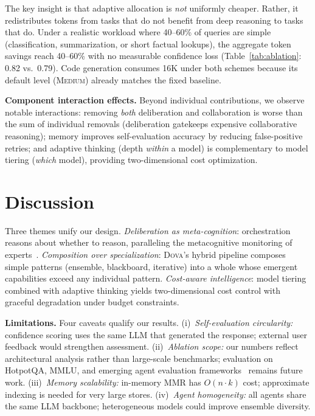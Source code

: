 \documentclass{article}
\theoremstyle{plain}
\theoremstyle{definition}
\newcommand{\dova}{\textsc{Dova}}
\begin{document}
The key insight is that adaptive allocation is \emph{not} uniformly cheaper.
Rather, it redistributes tokens from tasks that do not benefit from deep
reasoning to tasks that do.  Under a realistic workload where 40--60\% of
queries are simple (classification, summarization, or short factual lookups),
the aggregate token savings reach 40--60\% with no measurable confidence loss
(Table~\ref{tab:ablation}: 0.82 vs.\ 0.79).  Code generation consumes 16K
under both schemes because its default level (\textsc{Medium}) already matches
the fixed baseline.

\textbf{Component interaction effects.}\quad
Beyond individual contributions, we observe notable interactions: removing
\emph{both} deliberation and collaboration is worse than the sum of
individual removals (deliberation gatekeeps expensive collaborative
reasoning); memory improves self-evaluation accuracy by reducing
false-positive retries; and adaptive thinking (depth \emph{within} a model)
is complementary to model tiering (\emph{which} model), providing
two-dimensional cost optimization.

\section{Discussion}\label{sec:discussion}

Three themes unify our design.  \emph{Deliberation as meta-cognition}:
orchestration reasons about whether to reason, paralleling the metacognitive
monitoring of experts~\citep{shinn2023reflexion}.  \emph{Composition over
specialization}: \dova{}'s hybrid pipeline composes simple patterns (ensemble,
blackboard, iterative) into a whole whose emergent capabilities exceed any
individual pattern.  \emph{Cost-aware intelligence}: model tiering combined
with adaptive thinking yields two-dimensional cost control with graceful
degradation under budget constraints.

\textbf{Limitations.}\label{sec:limitations}\quad
Four caveats qualify our results.  (i)~\emph{Self-evaluation circularity:}
confidence scoring uses the same LLM that generated the response; external
user feedback would strengthen assessment.  (ii)~\emph{Ablation scope:} our
numbers reflect architectural analysis rather than large-scale benchmarks;
evaluation on HotpotQA, MMLU, and emerging agent evaluation
frameworks~\citep{ferrag2025agents} remains future work.  (iii)~\emph{Memory
scalability:} in-memory MMR has $O(n\cdot k)$ cost; approximate indexing is
needed for very large stores.  (iv)~\emph{Agent homogeneity:} all agents share
the same LLM backbone; heterogeneous models could improve ensemble diversity.
\end{document}
